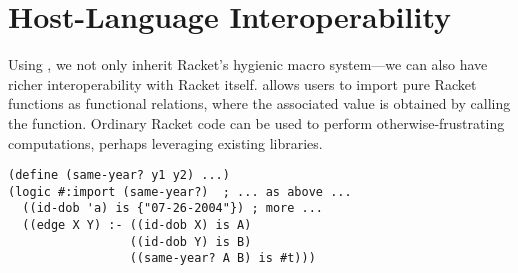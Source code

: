 \documentclass[dvipsnames,sigplan,screen,review,anonymous,acmthm,nonacm]{acmart}
\begin{document}
\begin{figure}[h]
  \begin{center}
  \end{center}
\end{figure}

\section{Host-Language Interoperability}


Using \syntaxspec{}, we not only inherit Racket's hygienic macro system---we can
also have richer interoperability with Racket itself. \miniDusa{} allows users
to import pure Racket functions as functional relations, where the
associated value is obtained by calling the function. Ordinary Racket code can
be used to perform otherwise-frustrating computations, perhaps leveraging
existing libraries.

\begin{verbatim}
(define (same-year? y1 y2) ...)
(logic #:import (same-year?)  ; ... as above ...
  ((id-dob 'a) is {"07-26-2004"}) ; more ...
  ((edge X Y) :- ((id-dob X) is A)
                 ((id-dob Y) is B)
                 ((same-year? A B) is #t)))
\end{verbatim}
\end{document}

